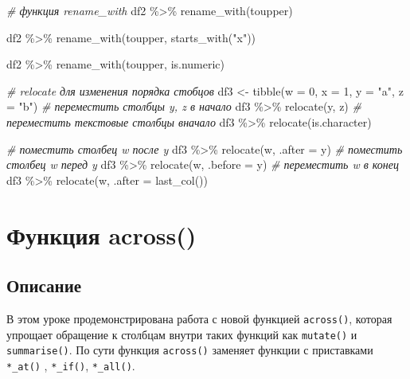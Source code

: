 \documentclass[
]{book}
\newenvironment{Shaded}{\begin{snugshade}}{\end{snugshade}}
\newcommand{\AttributeTok}[1]{\textcolor[rgb]{0.77,0.63,0.00}{#1}}
\newcommand{\CommentTok}[1]{\textcolor[rgb]{0.56,0.35,0.01}{\textit{#1}}}
\newcommand{\DecValTok}[1]{\textcolor[rgb]{0.00,0.00,0.81}{#1}}
\newcommand{\FunctionTok}[1]{\textcolor[rgb]{0.00,0.00,0.00}{#1}}
\newcommand{\NormalTok}[1]{#1}
\newcommand{\OtherTok}[1]{\textcolor[rgb]{0.56,0.35,0.01}{#1}}
\newcommand{\SpecialCharTok}[1]{\textcolor[rgb]{0.00,0.00,0.00}{#1}}
\newcommand{\StringTok}[1]{\textcolor[rgb]{0.31,0.60,0.02}{#1}}
\begin{document}
\begin{Shaded}
\begin{Highlighting}[]
\CommentTok{\# функция rename\_with}
\NormalTok{df2 }\SpecialCharTok{\%\textgreater{}\%} \FunctionTok{rename\_with}\NormalTok{(toupper)}

\NormalTok{df2 }\SpecialCharTok{\%\textgreater{}\%} \FunctionTok{rename\_with}\NormalTok{(toupper, }\FunctionTok{starts\_with}\NormalTok{(}\StringTok{"x"}\NormalTok{))}

\NormalTok{df2 }\SpecialCharTok{\%\textgreater{}\%} \FunctionTok{rename\_with}\NormalTok{(toupper, is.numeric)}


\CommentTok{\# relocate для изменения порядка стобцов}
\NormalTok{df3 }\OtherTok{\textless{}{-}} \FunctionTok{tibble}\NormalTok{(}\AttributeTok{w =} \DecValTok{0}\NormalTok{, }\AttributeTok{x =} \DecValTok{1}\NormalTok{, }\AttributeTok{y =} \StringTok{"a"}\NormalTok{, }\AttributeTok{z =} \StringTok{"b"}\NormalTok{)}
\CommentTok{\# переместить столбцы y, z в начало}
\NormalTok{df3 }\SpecialCharTok{\%\textgreater{}\%} \FunctionTok{relocate}\NormalTok{(y, z)}
\CommentTok{\# переместить текстовые столбцы вначало}
\NormalTok{df3 }\SpecialCharTok{\%\textgreater{}\%} \FunctionTok{relocate}\NormalTok{(is.character)}

\CommentTok{\# поместить столбец w после y}
\NormalTok{df3 }\SpecialCharTok{\%\textgreater{}\%} \FunctionTok{relocate}\NormalTok{(w, }\AttributeTok{.after =}\NormalTok{ y)}
\CommentTok{\# поместить столбец w перед y}
\NormalTok{df3 }\SpecialCharTok{\%\textgreater{}\%} \FunctionTok{relocate}\NormalTok{(w, }\AttributeTok{.before =}\NormalTok{ y)}
\CommentTok{\# переместить w в конец}
\NormalTok{df3 }\SpecialCharTok{\%\textgreater{}\%} \FunctionTok{relocate}\NormalTok{(w, }\AttributeTok{.after =} \FunctionTok{last\_col}\NormalTok{())}
\end{Highlighting}
\end{Shaded}

\hypertarget{ux444ux443ux43dux43aux446ux438ux44f-across}{%
\chapter{Функция across()}\label{ux444ux443ux43dux43aux446ux438ux44f-across}}

\hypertarget{ux43eux43fux438ux441ux430ux43dux438ux435-1}{%
\section{Описание}\label{ux43eux43fux438ux441ux430ux43dux438ux435-1}}

В этом уроке продемонстрирована работа с новой функцией \texttt{across()}, которая упрощает обращение к столбцам внутри таких функций как \texttt{mutate()} и \texttt{summarise()}. По сути функция \texttt{across()} заменяет функции с приставками \texttt{*\_at()} , \texttt{*\_if()}, \texttt{*\_all()}.
\end{document}
